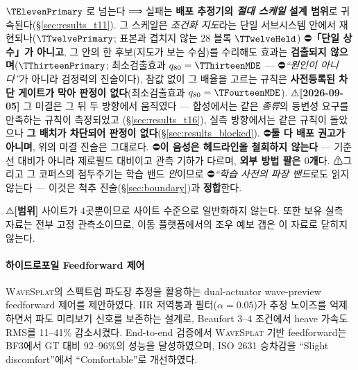 \documentclass[11pt]{report}
\numberwithin{equation}{chapter}
\numberwithin{figure}{chapter}
\numberwithin{table}{chapter}
\newcommand{\WS}{\textsc{WaveSplat}}
\begin{document}
\begin{itemize}
        $\TElevenPrimary$ 로 넘는다 ⟹ 실패는 \textbf{배포 추정기의 \emph{절대 스케일}
        설계 범위}로 귀속된다(\S\ref{sec:results_t11}). 그 스케일은 \emph{조건화 지도}라는
        단일 서브시스템 안에서 재현되나($\TTwelvePrimary$; 표본과 겹치지 않는 $28$ 블록
        $\TTwelveHeld$) ⛔\textbf{「단일 상수」가 아니고}, 그 안의 한 후보(지도가 보는
        수심)를 수리해도 효과는 \textbf{검출되지 않으며}($\TThirteenPrimary$; 최소검출효과
        $q_{80} = \TThirteenMDE$ --- ⛔\emph{``원인이 아니다''}가 아니라 검정력의 진술이다),
        참값 없이 그 배율을 고르는 규칙은 \textbf{사전등록된 차단 게이트가 막아 판정이
        없다}(최소검출효과 $q_{80} = \TFourteenMDE$).
        ⚠\textbf{[2026-09-05]} 그 미결은 그 뒤 두 방향에서 움직였다 --- 합성에서는 같은
        \emph{종류}의 등변성 요구를 만족하는 규칙이 측정되었고
        (\S\ref{sec:results_t16}), 실측 방향에서는 같은 규칙이 돌았으나 \textbf{그 배치가
        차단되어 판정이 없다}(\S\ref{sec:results_blocked}). ⛔\textbf{둘 다 배포 권고가
        아니며}, 위의 미결 진술은 그대로다.
        ⛔\textbf{이 음성은 헤드라인을 철회하지 않는다} --- 기준선 대비가 아니라 제로필드
        대비이고 관측 기하가 다르며, \textbf{외부 방법 팔은 $0$개}다. ⚠그리고 그 코퍼스의
        첨두주기는 학습 밴드 \emph{안}이므로 ⛔\emph{``학습 사전의 파장 밴드}로도 읽지
        않는다 --- 이것은 척추 진술(\S\ref{sec:boundary})과 \textbf{정합}한다.
\end{itemize}
⚠\textbf{[범위]} 사이트가 $4$곳뿐이므로 사이트 수준으로 일반화하지 않는다. 또한 보유
실측 자료는 전부 고정 관측소이므로, 이동 플랫폼에서의 조우 예보 갭은 이 자료로 닫히지 않는다.

\paragraph{하이드로포일 Feedforward 제어}
\WS{}의 스펙트럼 파도장 추정을 활용하는 dual-actuator wave-preview feedforward
제어를 제안하였다. IIR 저역통과 필터($\alpha=0.05$)가 추정 노이즈를 억제하면서
파도 미리보기 신호를 보존하는 설계로,
Beaufort 3--4 조건에서 heave 가속도 RMS를 11--41\% 감소시켰다.
End-to-end 검증에서 \WS{} 기반 feedforward는 BF3에서
GT 대비 92--96\%의 성능을 달성하였으며,
ISO 2631 승차감을 ``Slight discomfort''에서 ``Comfortable''로 개선하였다.
\end{document}
